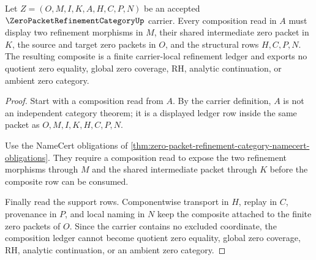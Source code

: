 \begin{theorem}
\label{thm:zero-packet-refinement-category-composition-ledger}
Let $Z=(O,M,I,K,A,H,C,P,N)$ be an accepted $\ZeroPacketRefinementCategoryUp$ carrier. Every composition read in $A$ must display two refinement morphisms in $M$, their shared intermediate zero packet in $K$, the source and target zero packets in $O$, and the structural rows $H,C,P,N$. The resulting composite is a finite carrier-local refinement ledger and exports no quotient zero equality, global zero coverage, RH, analytic continuation, or ambient zero category.
\end{theorem}
\begin{proof}
Start with a composition read from $A$. By the carrier definition, $A$ is not an independent category theorem; it is a displayed ledger row inside the same packet as $O,M,I,K,H,C,P,N$.

Use the NameCert obligations of \autoref{thm:zero-packet-refinement-category-namecert-obligations}. They require a composition read to expose the two refinement morphisms through $M$ and the shared intermediate packet through $K$ before the composite row can be consumed.

Finally read the support rows. Componentwise transport in $H$, replay in $C$, provenance in $P$, and local naming in $N$ keep the composite attached to the finite zero packets of $O$. Since the carrier contains no excluded coordinate, the composition ledger cannot become quotient zero equality, global zero coverage, RH, analytic continuation, or an ambient zero category.
\end{proof}


\begin{closurestatus}{\ZeroPacketRefinementCategoryUp}
  \theoryclosure{\seedClosure}
  \formalstatus{\unformalizedV}
\end{closurestatus}
